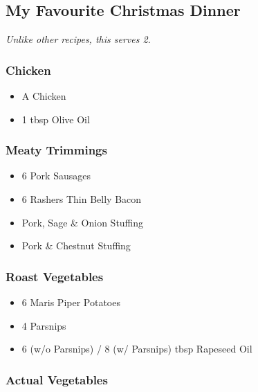 \documentclass[11pt, english]{article}
\begin{document}
\newpage

	\subsection{My Favourite Christmas Dinner}

	\textit{Unlike other recipes, this serves 2.}

		\subsubsection*{Chicken}

	\begin{itemize}
        \setlength\itemsep{0cm}
		\item A Chicken
		\item 1 tbsp Olive Oil
	\end{itemize}

		\subsubsection*{Meaty Trimmings}

	\begin{itemize}
        \setlength\itemsep{0cm}
		\item 6 Pork Sausages
		\item 6 Rashers Thin Belly Bacon
		\item Pork, Sage \& Onion Stuffing
		\item Pork \& Chestnut Stuffing
	\end{itemize}

		\subsubsection*{Roast Vegetables}

	\begin{itemize}
        \setlength\itemsep{0cm}
		\item 6 Maris Piper Potatoes
		\item 4 Parsnips
		\item 6 (w/o Parsnips) / 8 (w/ Parsnips) tbsp Rapeseed Oil 
	\end{itemize}

		\subsubsection*{Actual Vegetables}
\end{document}
